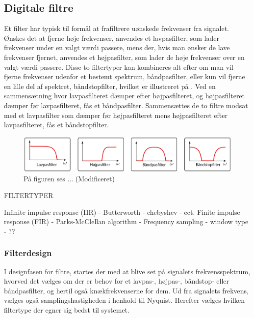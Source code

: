\subsection{Digitale filtre}


Et filter har typisk til formål at frafiltrere uønskede frekvenser fra signalet. Ønskes det at fjerne høje frekvenser, anvendes et lavpasfilter, som lader frekvenser under en valgt værdi passere, mens der, hvis man ønsker de lave frekvenser fjernet, anvendes et højpasfilter, som lader de høje frekvenser over en valgt værdi passere. Disse to filtertyper kan kombineres alt efter om man vil fjerne frekvenser udenfor et bestemt spektrum, båndpasfilter, eller kun vil fjerne en lille del af spektret, båndstopfilter, hvilket er illustreret på . Ved en sammensætning hvor lavpasfilteret dæmper efter højpasfilteret, og højpasfilteret dæmper før lavpasfilteret, fås et båndpasfilter. Sammensættes de to filtre modsat med et lavpasfilter som dæmper før højpasfilteret mens højpasfilteret efter lavpasfilteret, fås et båndstopfilter.
\citep{Ramsden2001}

\begin{figure}[H]
	\centering
	\includegraphics[scale=0.2]{figures/bProblemloesning/filtre.png}
	\caption{På figuren ses ... \citep{Aasvik2016} (Modificeret)}
	\label{fig:filtre}
\end{figure}

FILTERTYPER

Infinite impulse response (IIR)
- Butterworth
- chebyshev 
- ect. 
Finite impulse response (FIR)
- Parks-McClellan algorithm
- Frequency sampling
- window type
- ??

\subsubsection{Filterdesign}
I designfasen for filtre, startes der med at blive set på signalets frekvensspektrum, hvorved det vælges om der er behov for et lavpas-, højpas-, båndstop- eller båndpasfilter, og hertil også knækfrekvenserne for dem. Ud fra signalets frekvens, vælges også samplingshastigheden i henhold til Nyquist. Herefter vælges hvilken filtertype der egner sig bedst til systemet. 

